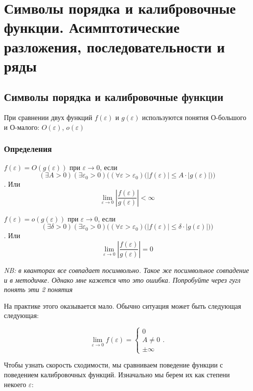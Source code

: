 	\newpage
	
	\section{Символы порядка и калибровочные функции. Асимптотические разложения, последовательности и ряды}
	
	\subsection{Символы порядка и калибровочные функции}
	
	При сравнении двух функций $f(\varepsilon)$ и $g(\varepsilon)$ используются понятия О-большого и О-малого: $O(\varepsilon)$, $o(\varepsilon)$
	
	\subsubsection{Определения}
	
	$f(\varepsilon) = O(g(\varepsilon))$ при $\varepsilon \to 0$, если $$(\exists A > 0)(\exists \varepsilon_0 > 0)\bigl((\forall \varepsilon > \varepsilon_0)\bigl(|f(\varepsilon)| \leq A \cdot |g(\varepsilon)|\bigr)\bigr)$$. Или $$\lim_{\varepsilon \to 0} \left| \frac{f(\varepsilon)}{g(\varepsilon)} \right| < \infty$$
	
	$f(\varepsilon) = o(g(\varepsilon))$ при $\varepsilon \to 0$, если $$(\exists \delta > 0)(\exists \varepsilon_0 > 0)\bigl((\forall \varepsilon > \varepsilon_0)\bigl(|f(\varepsilon)| \leq \delta \cdot |g(\varepsilon)|\bigr)\bigr)$$. Или $$\lim_{\varepsilon \to 0} \left| \frac{f(\varepsilon)}{g(\varepsilon)} \right| = 0$$
	
	\textit{NB: в кванторах все совпадает посимвольно. Такое же посимвольное совпадение и в методичке. Однако мне кажется что это ошибка. Попробуйте через гугл понять эти 2 понятия}
	
	На практике этого оказывается мало. Обычно ситуация может быть следующая следующая:
	
	\begin{equation}
		\lim_{\varepsilon \to 0} f(\varepsilon) =
		\begin{cases}
			0 \\
			A \neq 0 \\
			\pm \infty
		\end{cases}.
	\end{equation}
	
	Чтобы узнать скорость сходимости, мы сравниваем поведение функции с поведением калибровочных функций. Изначально мы берем их как степени некоего $\varepsilon$:
	
